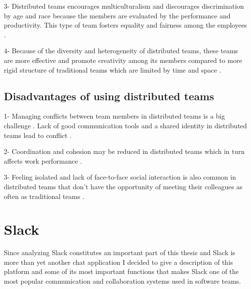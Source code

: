 3- Distributed teams encourages multiculturalism and discourages discrimination by age and race because the members are evaluated by the performance and productivity. This type of team fosters equality and fairness among the employees \citep{Bergiel2007}.

4- Because of the diversity and heterogeneity of distributed teams, these teams are more effective and promote creativity among its members compared to more rigid structure of traditional teams which are limited by time and space \citep{Bergiel2008}.

\section{Disadvantages of using distributed teams}

1- Managing conflicts between team members in distributed teams is a big challenge \citep{Hinds2003}. Lack of good communication tools and a shared identity in distributed teams lead to conflict \citep{Hinds2005a}. 

2- Coordination and cohesion may be reduced in distributed teams which in turn affects work performance \citep{DeRosa2004}.

3- Feeling isolated and lack of face-to-face social interaction is also common in distributed teams that don't have the opportunity of meeting their colleagues as often as traditional teams \citep{Kiesler2002}.

\chapter{Slack} \label{slack}

Since analyzing Slack constitutes an important part of this thesis and Slack is more than yet another chat application I decided to give a description of this platform and some of its most important functions that makes Slack one of the most popular communication and collaboration systems used in software teams.


